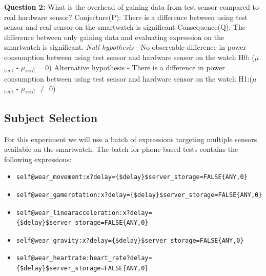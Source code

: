     \textbf{Question 2:}  What is the overhead of gaining data from test sensor compared to real hardware sensor?\newline
    Conjecture(P): There is  a difference between using test sensor and real sensor on the smartwatch is significant\newline
    Consequence(Q): The difference between only gaining data and evaluating expression on the smartwatch is significant.\newline
    \textit{Null hypothesis} - No observable difference in power consumption between using test sensor and hardware sensor on the watch\newline
H0: ($\mu$\textsubscript{test} - $\mu$\textsubscript{real} = 0)\newline
    Alternative hypothesis - There is a difference in power consumption between using test sensor and hardware sensor on the watch\newline
H1:($\mu$\textsubscript{test} - $\mu$\textsubscript{real} $\neq$ 0)\newline

\subsection{Subject Selection}
For this experiment we will use a batch of expressions targeting multiple sensors available on the smartwatch.
The batch for phone based tests contains the following expressions:
\begin{itemize}
 \item \begin{verbatim}self@wear_movement:x?delay={$delay}$server_storage=FALSE{ANY,0}\end{verbatim}
 \item \begin{verbatim}self@wear_gamerotation:x?delay={$delay}$server_storage=FALSE{ANY,0}\end{verbatim}
 \item \begin{verbatim}self@wear_linearacceleration:x?delay={$delay}$server_storage=FALSE{ANY,0}\end{verbatim}
 \item \begin{verbatim}self@wear_gravity:x?delay={$delay}$server_storage=FALSE{ANY,0}\end{verbatim}
 \item \begin{verbatim}self@wear_heartrate:heart_rate?delay={$delay}$server_storage=FALSE{ANY,0}\end{verbatim}
\end{itemize}

